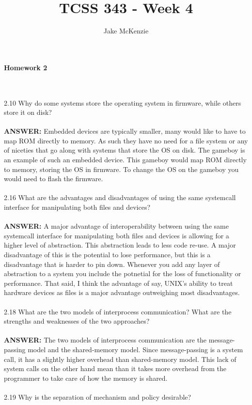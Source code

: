 \documentclass[12pt]{article}
\begin{document}
\title{TCSS 343 - Week 4}
\author{Jake McKenzie}
\maketitle
\noindent\centerline{\textbf{Homework 2}}
\\\\2.10 Why do some systems store the operating system in firmware, while
others store it on disk?\\\\
\textbf{ANSWER: }Embedded devices are typically smaller, many would
like to have to map ROM directly to memory. As such they have no need 
for a file system or any of niceties that go along with systems that 
store the OS on disk. The gameboy is an example of such an embedded 
device. This gameboy would map ROM directly to memory, storing the 
OS in firmware. To change the OS on the gameboy you would need to flash 
the firmware. 
\\\\2.16 What are the advantages and disadvantages of using the same 
systemcall interface for manipulating both files and devices?\\\\
\textbf{ANSWER: }A major advantage of interoperability between 
using the same systemcall interface for manipulating both 
files and devices is allowing for a higher level of abstraction.
This abstraction leads to less code re-use. A major disadvantage 
of this is the potential to lose performance, but this is a 
disadvantage that is harder to pin down. Whenever you add any 
layer of abstraction to a system you include the potnetial for 
the loss of functionality or performance. That said, I think 
the advantage of say, UNIX's ability to treat hardware devices 
as files is a major advantage outweighing most disadvantages.
\\\\2.18 What are the two models of interprocess communication? What 
are the strengths and weaknesses of the two approaches?\\\\
\textbf{ANSWER: }The two models of interprocess communication 
are the message-passing model and the shared-memory model. 
Since message-passing is a system call, it has a slightly 
higher overhead than shared-memory model. This lack of system 
calls on the other hand mean than it takes more overhead from
the programmer to take care of how the memory is shared.
\\\\2.19 Why is the separation of mechanism and policy desirable?\\\\
\end{document}
